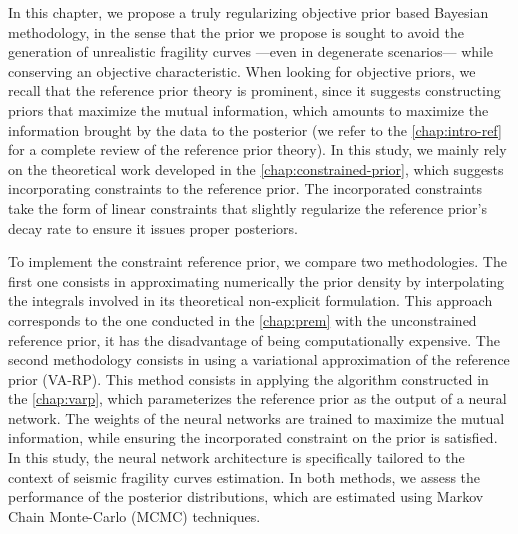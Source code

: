 

In this chapter, we propose a truly regularizing objective prior based Bayesian methodology, in the sense that the prior we propose is sought to avoid the generation of unrealistic fragility curves ---even in degenerate scenarios--- while conserving an objective characteristic.
When looking for objective priors, we recall that the reference prior theory is prominent, since it suggests constructing priors that maximize the mutual information,  which amounts to maximize the information brought by the data to the posterior (we refer to the \cref{chap:intro-ref} for a complete review of the reference prior theory).
In this study, we
mainly rely on the theoretical work developed in the \cref{chap:constrained-prior}, which suggests incorporating constraints to the reference prior. %
The incorporated constraints %
take the form of linear constraints that slightly regularize the reference prior's decay rate to ensure it issues proper posteriors.


To implement the constraint reference prior, we compare two methodologies.
The first one consists in approximating numerically the prior density by interpolating the integrals involved in its theoretical non-explicit formulation. %
This approach corresponds to the one conducted in the \cref{chap:prem} with the unconstrained reference prior, it has the disadvantage of being computationally expensive.
The second methodology consists in using a variational approximation of the reference prior (VA-RP).
This method consists in applying the algorithm constructed in the \cref{chap:varp}, which parameterizes the reference prior as the output of a neural network.
The weights of the neural networks are trained to maximize the mutual information, while ensuring the incorporated constraint on the prior is satisfied.
In this study, the neural network architecture is specifically tailored to the context of seismic fragility curves estimation.
In both methods, we assess the performance of the posterior distributions, which are estimated using Markov Chain Monte-Carlo (MCMC) techniques.


